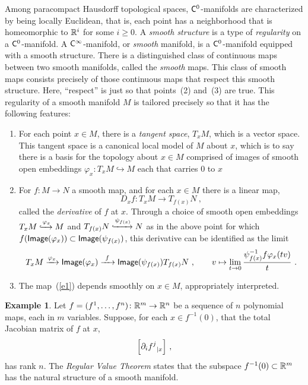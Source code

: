 \documentclass{article}
\newcommand{\xra}{\xrightarrow}
\theoremstyle{definition}
\newtheorem{example}[theorem]{Example}
\begin{document}
Among paracompact Hausdorff topological spaces, $\mathsf C^0$-manifolds are characterized by being locally Euclidean, that is, each point has a neighborhood that is homeomorphic to $\mathbb R^i$ for some $i\geq 0$.
A \emph{smooth structure} is a type of \emph{regularity} on a $\mathsf C^0$-manifold.  
A $\mathsf C^\infty$-manifold, or \emph{smooth} manifold, is a $\mathsf C^0$-manifold equipped with a smooth structure.  
There is a distinguished class of continuous maps between two smooth manifolds, called the \emph{smooth} maps. This class of smooth maps consists precisely of those continuous maps that respect this smooth structure.
Here, ``respect'' is just so that points~(2) and~(3) are true.  
This regularity of a smooth manifold $M$ is tailored precisely so that it has the following features:
\begin{enumerate}
\item
For each point $x\in M$, there is a \emph{tangent space}, $T_x M$, which is a vector space.
This tangent space is a canonical local model of $M$ about $x$, which is to say there is a basis for the topology about $x\in M$ comprised of images of smooth open embeddings $\varphi_x: T_x M \hookrightarrow M$ each that carries $0$ to $x$  

\item
For $f: M \to N$ a smooth map, and for each $x\in M$ there is a linear map,
\[
D_x f: T_x M 
\longrightarrow 
T_{f(x)}N
~,
\]
called the \emph{derivative} of $f$ at $x$.  
Through a choice of smooth open embeddings $T_x M \xhookrightarrow{\varphi_x} M$ and $T_{f(x)}N \xhookrightarrow{\psi_{f(x)}} N$ as in the above point for which $f({\sf Image}(\varphi_x)) \subset {\sf Image}(\psi_{f(x)})$, this derivative can be identified as the limit
\begin{equation}\label{e1}
T_x M 
\xra{\varphi_x} 
{\sf Image}(\varphi_x) 
\xra{~f~}  
{\sf Image}( \psi_{f(x)})
T_{f(x)}N 
~,\qquad
v\mapsto 
\lim_{t\to 0} \frac{\psi_{f(x)}^{-1} f \varphi_x(tv)}{t}
~.
\end{equation}

\item
The map~(\ref{e1}) depends smoothly on $x\in M$, appropriately interpreted.  
\end{enumerate}

\begin{example}
Let $f=(f^1,\dots,f^n)\colon \mathbb R^m \to \mathbb R^n$ be a sequence of $n$ polynomial maps, each in $m$ variables.  
Suppose, for each $x\in f^{-1}(0)$, that the total Jacobian matrix of $f$ at $x$,
\[
\Bigl[ 
{\partial_i f^j}_{|x}
\Bigr]
~,
\]
has rank $n$.  
The \emph{Regular Value Theorem} states that the subspace $f^{-1}(0) \subset \mathbb R^m$ has the natural structure of a smooth manifold.  
\end{example}
\end{document}
